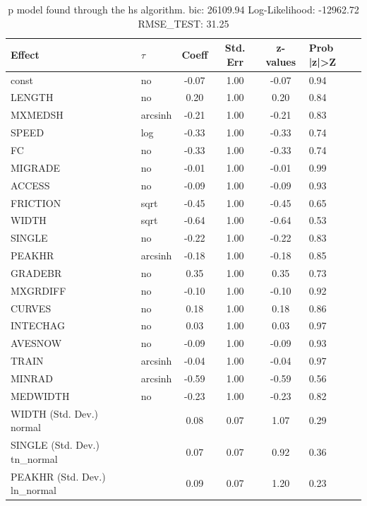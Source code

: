 \begin{table}
	\caption{p model found through the hs algorithm. bic: 26109.94 Log-Likelihood: -12962.72 RMSE_TEST: 31.25}
	\begin{center}
		\begin{tabular}{|l|l|c|c|c|l|}
			\hline
			Effect & $\tau$ & Coeff & Std. Err & z-values & Prob |z|>Z \\
			\hline
			const & no & -0.07 & 1.00 & -0.07 & 0.94 \\
			\hline
			LENGTH & no & 0.20 & 1.00 & 0.20 & 0.84 \\
			\hline
			MXMEDSH & arcsinh & -0.21 & 1.00 & -0.21 & 0.83 \\
			\hline
			SPEED & log & -0.33 & 1.00 & -0.33 & 0.74 \\
			\hline
			FC & no & -0.33 & 1.00 & -0.33 & 0.74 \\
			\hline
			MIGRADE & no & -0.01 & 1.00 & -0.01 & 0.99 \\
			\hline
			ACCESS & no & -0.09 & 1.00 & -0.09 & 0.93 \\
			\hline
			FRICTION & sqrt & -0.45 & 1.00 & -0.45 & 0.65 \\
			\hline
			WIDTH & sqrt & -0.64 & 1.00 & -0.64 & 0.53 \\
			\hline
			SINGLE & no & -0.22 & 1.00 & -0.22 & 0.83 \\
			\hline
			PEAKHR & arcsinh & -0.18 & 1.00 & -0.18 & 0.85 \\
			\hline
			GRADEBR & no & 0.35 & 1.00 & 0.35 & 0.73 \\
			\hline
			MXGRDIFF & no & -0.10 & 1.00 & -0.10 & 0.92 \\
			\hline
			CURVES & no & 0.18 & 1.00 & 0.18 & 0.86 \\
			\hline
			INTECHAG & no & 0.03 & 1.00 & 0.03 & 0.97 \\
			\hline
			AVESNOW & no & -0.09 & 1.00 & -0.09 & 0.93 \\
			\hline
			TRAIN & arcsinh & -0.04 & 1.00 & -0.04 & 0.97 \\
			\hline
			MINRAD & arcsinh & -0.59 & 1.00 & -0.59 & 0.56 \\
			\hline
			MEDWIDTH & no & -0.23 & 1.00 & -0.23 & 0.82 \\
			\hline
			WIDTH (Std. Dev.) normal &  & 0.08 & 0.07 & 1.07 & 0.29 \\
			\hline
			SINGLE (Std. Dev.) tn_normal &  & 0.07 & 0.07 & 0.92 & 0.36 \\
			\hline
			PEAKHR (Std. Dev.) ln_normal &  & 0.09 & 0.07 & 1.20 & 0.23 \\

\end{tabular}
\end{center}
\end{table}
